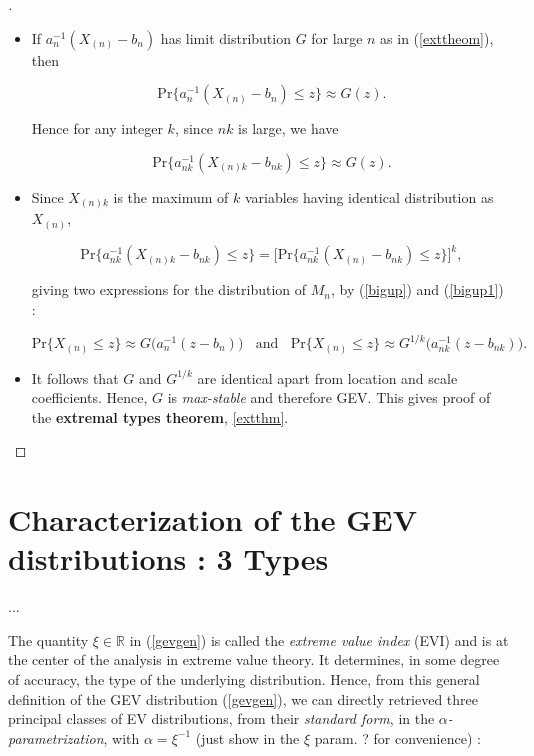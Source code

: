 \documentclass[11pt,a4paper,openany ]{book}
\begin{document}
\begin{proof}[\nopunct ]
\ \ \	\begin{itemize}
    \item	If $a_n^{-1}(X_{(n)}-b_n)$ has limit distribution $G$ for large $n$ as in (\ref{exttheom}), then
	
	\begin{equation*} \label{gevproof1}
	\text{Pr}\Big\{ a_n^{-1}(X_{(n)}-b_n)\leq z\Big\}\approx G(z).
	\end{equation*}
	
	Hence for any integer $k$, since $nk$ is large, we have
	
	\begin{equation} \label{bigup}
	\text{Pr}\Big\{ a_{nk}^{-1}(X_{(n)k}-b_{nk})\leq z\Big\}\approx G(z).
	\end{equation}
	
	\item Since $X_{(n)k}$ is the maximum of $k$ variables having identical distribution as $X_{(n)}$,
	
	\begin{equation} \label{bigup1}
	\text{Pr}\Big\{ a_{nk}^{-1}(X_{(n)k}-b_{nk})\leq z\Big\}=\Big[\text{Pr}\big\{ a_{nk}^{-1}(X_{(n)}-b_{nk})\leq z\big\}\Big]^k,
	\end{equation}
	
	giving two expressions for the distribution of $M_n$, by (\ref{bigup}) and (\ref{bigup1}) :
	
	\begin{equation*}\label{gevproofl}
	\text{Pr}\{X_{(n)}\leq z\}\approx G\Big(a_n^{-1}(z-b_n)\Big) \ \ \ \ \text{and} \ \ \ \ \text{Pr}\{X_{(n)}\leq z\} \approx G^{1/k}\Big(a_{nk}^{-1}(z-b_{nk})\Big).
	\end{equation*}
	\item It follows that $G$ and $G^{1/k}$ are identical apart from location and scale coefficients. 
	Hence, $G$ is \emph{max-stable} and therefore GEV. This gives proof of the \textbf{extremal 
	types theorem}, \ref{extthm}.
  \end{itemize}
\end{proof}

\section{Characterization of the GEV distributions : 3 Types}
...

The quantity $\xi\in\mathbb{R}$ in (\ref{gevgen}) is called the \emph{extreme value index} (EVI) and is at the center of the analysis in extreme value theory. It determines, in some degree of accuracy, the type of the underlying distribution.
Hence, from this general definition of the GEV distribution (\ref{gevgen}), we can directly retrieved three principal classes of EV distributions, from their \emph{standard form}, in the \emph{$\alpha$-parametrization}, with $\alpha=\xi^{-1}$ (just show in the $\xi$ param. ? for convenience) :
\end{document}
